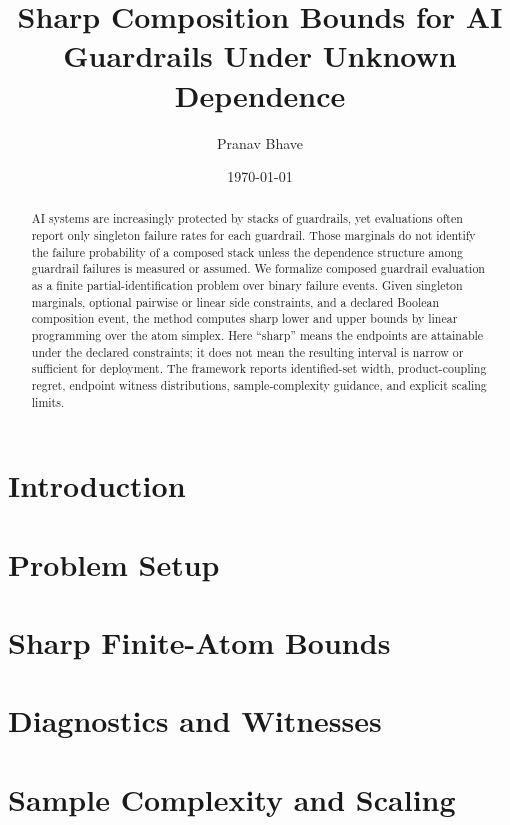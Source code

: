 \documentclass[11pt]{article}
\title{Sharp Composition Bounds for AI Guardrails Under Unknown Dependence}
\author{Pranav Bhave}
\date{\today}
\begin{document}
\maketitle

\begin{abstract}
AI systems are increasingly protected by stacks of guardrails, yet evaluations
often report only singleton failure rates for each guardrail. Those marginals do
not identify the failure probability of a composed stack unless the dependence
structure among guardrail failures is measured or assumed. We formalize
composed guardrail evaluation as a finite partial-identification problem over
binary failure events. Given singleton marginals, optional pairwise or linear
side constraints, and a declared Boolean composition event, the method computes
sharp lower and upper bounds by linear programming over the atom simplex. Here
``sharp'' means the endpoints are attainable under the declared constraints; it
does not mean the resulting interval is narrow or sufficient for deployment.
The framework reports identified-set width, product-coupling regret, endpoint
witness distributions, sample-complexity guidance, and explicit scaling limits.
\end{abstract}

\section{Introduction}


\section{Problem Setup}


\section{Sharp Finite-Atom Bounds}


\section{Diagnostics and Witnesses}


\section{Sample Complexity and Scaling}

\end{document}
